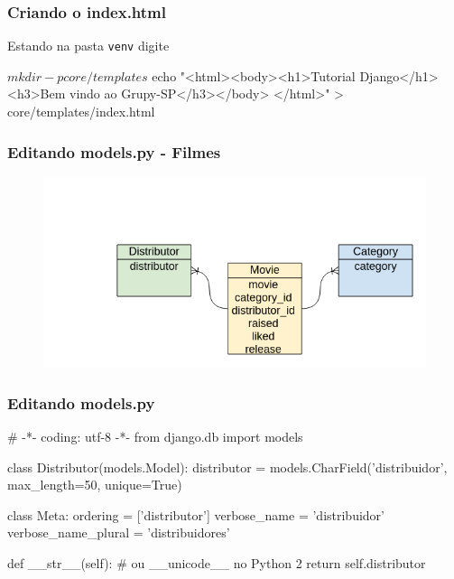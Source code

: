 \documentclass[aspectratio=169]{beamer}
\begin{document}
\begin{frame}[fragile]\frametitle{Criando o index.html}

Estando na pasta \texttt{venv} digite

\begin{bashcode}
	$ mkdir -p core/templates
	$ echo "<html><body><h1>Tutorial Django</h1>
	        <h3>Bem vindo ao Grupy-SP</h3></body>
	        </html>" > core/templates/index.html
\end{bashcode}


\end{frame}

\begin{frame}[fragile]\frametitle{Editando models.py - Filmes}

	\begin{figure}[h]
	  \centering
  		\includegraphics[width=.8\paperwidth]{img/diagram.png}
	\end{figure}

\end{frame}


\begin{frame}[fragile]\frametitle{Editando models.py}

\begin{pythoncode}
	# -*- coding: utf-8 -*-
	from django.db import models

	class Distributor(models.Model):
	    distributor = models.CharField('distribuidor',
	                                   max_length=50, unique=True)

	    class Meta:
	        ordering = ['distributor']
	        verbose_name = 'distribuidor'
	        verbose_name_plural = 'distribuidores'

	    def __str__(self): # ou __unicode__ no Python 2
	        return self.distributor
\end{pythoncode}

\end{frame}
\end{document}
